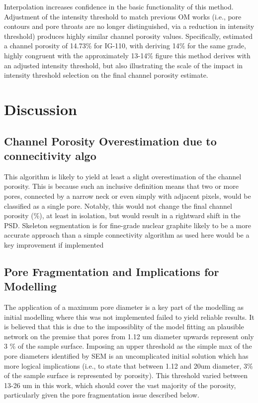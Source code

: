\documentclass[3p,twocolumn]{elsarticle}
\begin{document}
Interpolation increases confidence in the basic functionality of this method.
Adjustment of the intensity threshold to match previous OM works (i.e., pore
contours and pore throats are no longer distinguished, via a reduction in
intensity threshold) produces highly similar channel porosity values.
Specifically, \citep{Kane2011a} estimated a channel porosity of 14.73\% for
IG-110, with \citep{Huang2019} deriving 14\% for the same grade, highly
congruent with the approximately 13-14\% figure this method derives with an
adjusted intensity threshold, but also illustrating the scale of the impact in
intensity threshold selection on the final channel porosity estimate.

\section{Discussion}

  \subsection{Channel Porosity Overestimation due to connecitivity algo}
  This algorithm is likely to yield at least a  slight overestimation of the
channel porosity. This is because such an inclusive definition means that two or
more pores, connected by a narrow neck or even simply with adjacent pixels,
would be classified as a single pore. Notably, this would not change the final
channel porosity (\%), at least in isolation, but would result in a rightward
shift in the PSD. Skeleton segmentation is for fine-grade nuclear graphite
likely to be a more accurate approach than a simple connectivity algorithm as
used here would be a key improvement if implemented
\cite{ARREGUIMENA2022112047}

\subsection{Pore Fragmentation and Implications for Modelling}
The application of a maximum pore diameter is a key part of the modelling as
  initial modelling where this was not implemented failed to yield reliable
  results. It is believed that this is due to the impossiblity of the model
  fitting an plausible network on the premise that pores from 1.12 um diameter
  upwards represent only 3 \% of the sample surface. Imposing an upper threshold
  as the simple max of the pore diameters identified by SEM is an uncomplicated
  initial solution which has more logical implications (i.e., to state that
  between 1.12 and 20um diameter, 3\% of the sample surface is represented by
  porosity). This threshold varied between 13-26 um in this work, which should
  cover the vast majority of the porosity, particularly given the pore fragmentation
  issue described below.
\end{document}
